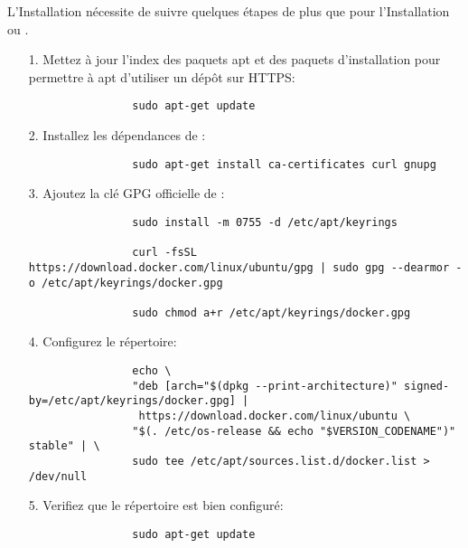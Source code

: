     L'Installation \linux{} nécessite de suivre quelques étapes de plus que pour l'Installation \macos{} ou \windows{}.\\
    \begin{itemize}
    
        \item[1.] Mettez à jour l'index des paquets apt et des paquets d'installation pour permettre à apt d'utiliser un dépôt sur HTTPS:
        
            \begin{lstlisting}
                sudo apt-get update
            \end{lstlisting}

        \item[2.] Installez les dépendances de \docker{}:

            \begin{lstlisting}
                sudo apt-get install ca-certificates curl gnupg
            \end{lstlisting}

        \item[3.] Ajoutez la clé GPG officielle de \docker{}:

            \begin{lstlisting}
                sudo install -m 0755 -d /etc/apt/keyrings

                curl -fsSL https://download.docker.com/linux/ubuntu/gpg | sudo gpg --dearmor -o /etc/apt/keyrings/docker.gpg

                sudo chmod a+r /etc/apt/keyrings/docker.gpg
            \end{lstlisting}

        \item[4.] Configurez le répertoire:\\

            \begin{lstlisting}
                echo \
                "deb [arch="$(dpkg --print-architecture)" signed-by=/etc/apt/keyrings/docker.gpg] |
                 https://download.docker.com/linux/ubuntu \
                "$(. /etc/os-release && echo "$VERSION_CODENAME")" stable" | \
                sudo tee /etc/apt/sources.list.d/docker.list > /dev/null
            \end{lstlisting}

        \item[5.] Verifiez que le répertoire est bien configuré:

            \begin{lstlisting}
                sudo apt-get update
            \end{lstlisting}    


\end{itemize}

